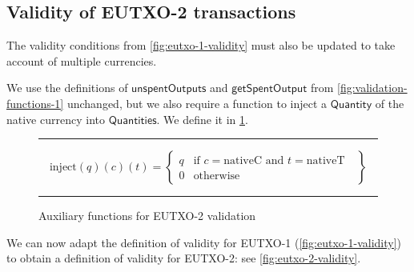 \documentclass[a4paper]{article}
\newcommand{\s}{\textsf}  %
\newcommand{\msf}[1]{\ensuremath{\mathsf{#1}}}
\newcommand\rfskip{7pt}
\newenvironment{ruledfigure}[1]{\begin{figure}[#1]\hrule\vspace{\rfskip}}{\vspace{\rfskip}\hrule\end{figure}}
\newcommand{\getSpent}{\msf{getSpentOutput}}
\newcommand{\unspent}{\msf{unspentOutputs}}
\newcommand{\qty}{\ensuremath{\s{Quantity}}}
\newcommand{\nativeCur}{\ensuremath{\mathrm{nativeC}}}
\newcommand{\nativeTok}{\ensuremath{\mathrm{nativeT}}}
\newcommand{\injectNative}{\ensuremath{\mathrm{inject}}}
\newcommand{\qtymap}{\ensuremath{\s{Quantities}}}
\begin{document}
\subsection{Validity of EUTXO-2 transactions}
\label{sec:eutxo-2-validity}

\bigskip
\noindent The validity conditions from
\cref{fig:eutxo-1-validity} must also be updated to take account
of multiple currencies.

We use the definitions of \unspent{}  and
\getSpent{} from \cref{fig:validation-functions-1} unchanged,
but we also require a function to inject a \qty{} of the native currency
into \qtymap{}. We define it in \cref{fig:validation-functions-2}.
\begin{displaymath}
\end{displaymath}
\begin{ruledfigure}{H}
  \begin{displaymath}
    \injectNative(q)(c)(t) = \left\{
    \begin{array}{ll}
      q & \mbox{if $c = \nativeCur$ and $t = \nativeTok$ }\\
      0 & \mbox{otherwise}
    \end{array}
    \right\}
  \end{displaymath}
  \caption{Auxiliary functions for EUTXO-2 validation}
  \label{fig:validation-functions-2}
\end{ruledfigure}

We can now adapt the definition of validity for EUTXO-1
(\cref{fig:eutxo-1-validity}) to obtain a definition of validity for
EUTXO-2: see \cref{fig:eutxo-2-validity}.
\end{document}
